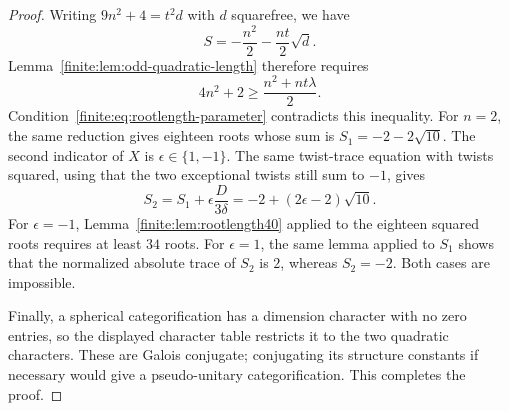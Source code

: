 \begin{proof}
Writing $9n^2+4=t^2d$ with $d$ squarefree, we have
\[
 S=-\frac{n^2}{2}-\frac{nt}{2}\sqrt d.
\]
Lemma~\ref{finite:lem:odd-quadratic-length} therefore requires
\[
 4n^2+2\geq\frac{n^2+nt\lambda}{2}.
\]
Condition~\eqref{finite:eq:rootlength-parameter} contradicts this inequality.
For $n=2$, the same reduction gives eighteen roots whose sum is
$S_1=-2-2\sqrt{10}$. The second indicator of $X$ is
$\epsilon\in\{1,-1\}$. The same twist-trace equation with twists squared,
using that the two exceptional twists still sum to $-1$, gives
\[
 S_2=S_1+\epsilon\frac{D}{3\delta}
     =-2+(2\epsilon-2)\sqrt{10}.
\]
For $\epsilon=-1$, Lemma~\ref{finite:lem:rootlength40} applied to the eighteen
squared roots requires at least $34$ roots. For $\epsilon=1$, the same
lemma applied to $S_1$ shows that the normalized absolute trace of $S_2$
is $2$, whereas $S_2=-2$. Both cases are impossible.

Finally, a spherical categorification has a dimension character with no zero entries,
so the displayed character table restricts it to the two quadratic characters.
These are Galois conjugate; conjugating its structure constants if necessary
would give a pseudo-unitary categorification. This completes the proof.
\end{proof}


